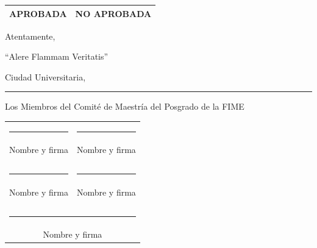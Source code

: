 \documentclass{article}
\renewcommand{\arraystretch}{2.0}
\begin{document}
\begin{center}
  
\begin{tabular}{|c|c|}
    \hline 
    APROBADA & NO APROBADA \\
    \hline
\end{tabular}

\quad

  Atentamente,

  ``Alere Flammam Veritatis''

  Ciudad Universitaria, \rule{5cm}{1pt}

  \quad
  
  Los Miembros del Comit\'{e} de Maestr\'{i}a del Posgrado de la FIME

  \vspace*{2cm}
  
  \renewcommand{\arraystretch}{1.0}  
  \begin{tabular}{cc}
\rule{5cm}{1pt} & \rule{5cm}{1pt} \\
    Nombre y firma
    &  Nombre y firma \\
    \phantom{xxx} & \phantom{xxx} \\
        \phantom{xxx} & \phantom{xxx} \\
    \rule{5cm}{1pt} & \rule{5cm}{1pt} \\
     Nombre y firma
     &  Nombre y firma \\
     \phantom{xxx} & \phantom{xxx} \\
     \phantom{xxx} & \phantom{xxx} \\     
    \multicolumn{2}{c}{\rule{5cm}{1pt}} \\
\multicolumn{2}{c}{Nombre y firma}
  \end{tabular}

  

\end{center}
\end{document}
